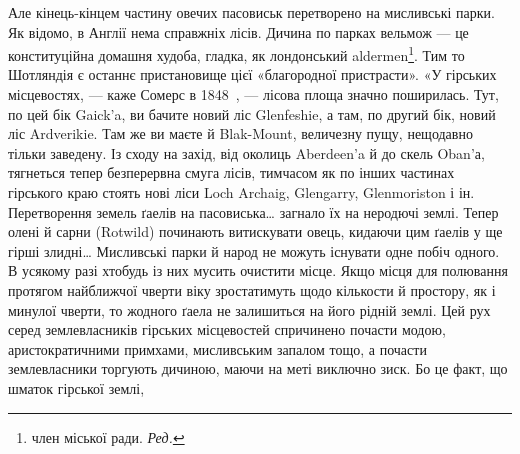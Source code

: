 Але кінець-кінцем частину овечих пасовиськ перетворено
на мисливські парки. Як відомо, в Англії нема справжніх лісів.
Дичина по парках вельмож — це конституційна домашня худоба,
гладка, як лондонський aldermen\footnote*{
член міської ради. \emph{Ред.}
}. Тим то Шотляндія є останнє
пристановище цієї «благородної пристрасти». «У гірських місцевостях,
— каже Сомерс в 1848~, — лісова площа значно
поширилась. Тут, по цей бік Gaick’a, ви бачите новий ліс Glenfeshie,
а там, по другий бік, новий ліс Ardverikie. Там же ви маєте
й Blak-Mount, величезну пущу, нещодавно тільки заведену.
Із сходу на захід, від околиць Aberdeen’a й до скель Oban’а,
тягнеться тепер безперервна смуга лісів, тимчасом як по інших
частинах гірського краю стоять нові ліси Loch Archaig, Glengarry,
Glenmoriston і ін. Перетворення земель ґаелів на пасовиська\dots{}
загнало їх на неродючі землі. Тепер олені й сарни (Rotwild)
починають витискувати овець, кидаючи цим ґаелів у ще
гірші злидні\dots{} Мисливські парки й народ не можуть існувати
одне побіч одного. В усякому разі хтобудь із них мусить очистити
місце. Якщо місця для полювання протягом найближчої чверти
віку зростатимуть щодо кількости й простору, як і минулої
чверти, то жодного ґаела не залишиться на його рідній землі.
Цей рух серед землевласників гірських місцевостей спричинено
почасти модою, аристократичними примхами, мисливським запалом
тощо, а почасти землевласники торгують дичиною, маючи
на меті виключно зиск. Бо це факт, що шматок гірської землі,
\parbreak{}  %
